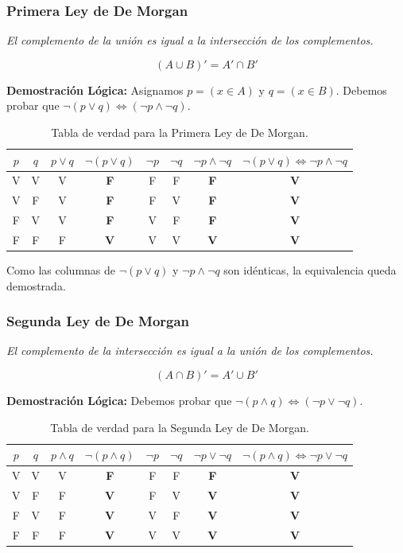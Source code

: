 \subsubsection{Primera Ley de De Morgan}
\textit{El complemento de la unión es igual a la intersección de los complementos.}

\[ (A \cup B)' = A' \cap B' \]

\noindent \textbf{Demostración Lógica:}
Asignamos $p = (x \in A)$ y $q = (x \in B)$.
Debemos probar que $\neg(p \lor q) \iff (\neg p \land \neg q)$.

\begin{table}[ht]
\centering
\renewcommand{\arraystretch}{1.2}
\begin{tabular}{|c|c||c|c||c|c||c||c|}
\hline
$p$ & $q$ & $p \lor q$ & $\neg(p \lor q)$ & $\neg p$ & $\neg q$ & $\neg p \land \neg q$ & $\neg(p \lor q) \iff \neg p \land \neg q$\\ \hline
V & V & V & \textbf{F} & F & F & \textbf{F} & \textbf{V} \\ \hline
V & F & V & \textbf{F} & F & V & \textbf{F} & \textbf{V} \\ \hline
F & V & V & \textbf{F} & V & F & \textbf{F} & \textbf{V} \\ \hline
F & F & F & \textbf{V} & V & V & \textbf{V} & \textbf{V}\\ \hline
\end{tabular}
\caption{Tabla de verdad para la Primera Ley de De Morgan.}
\end{table}

Como las columnas de $\neg(p \lor q)$ y $\neg p \land \neg q$ son idénticas, la equivalencia queda demostrada.

\vspace{0.5cm}

\subsubsection{Segunda Ley de De Morgan}
\textit{El complemento de la intersección es igual a la unión de los complementos.}

\[ (A \cap B)' = A' \cup B' \]

\noindent \textbf{Demostración Lógica:}
Debemos probar que $\neg(p \land q) \iff (\neg p \lor \neg q)$.

\begin{table}[ht]
\centering
\renewcommand{\arraystretch}{1.2}
\begin{tabular}{|c|c||c|c||c|c||c||c|}
\hline
$p$ & $q$ & $p \land q$ & $\neg(p \land q)$ & $\neg p$ & $\neg q$ & $\neg p \lor \neg q$ & $\neg (p \land q) \iff \neg p \lor \neg q$ \\ \hline
V & V & V & \textbf{F} & F & F & \textbf{F} & \textbf{V}  \\ \hline
V & F & F & \textbf{V} & F & V & \textbf{V} & \textbf{V} \\ \hline
F & V & F & \textbf{V} & V & F & \textbf{V} & \textbf{V} \\ \hline
F & F & F & \textbf{V} & V & V & \textbf{V} & \textbf{V} \\ \hline
\end{tabular}
\caption{Tabla de verdad para la Segunda Ley de De Morgan.}
\end{table}

